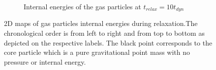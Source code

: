 \begin{figure}
\begin{subfigure}[b]{0.495\textwidth}
        \caption{Internal energies of the gas particles at  $t_{relax} = 10t_{dyn}$}%
    \end{subfigure}
    \caption{2D maps of gas particles internal energies during relaxation.The chronological order is from left to right and from top to bottom as depicted on the respective labels. The black point corresponds to the core particle which is a pure gravitational point mass with no pressure or internal energy.}
    \label{fig:internal_energy_maps_relaxation}
\end{figure}




















